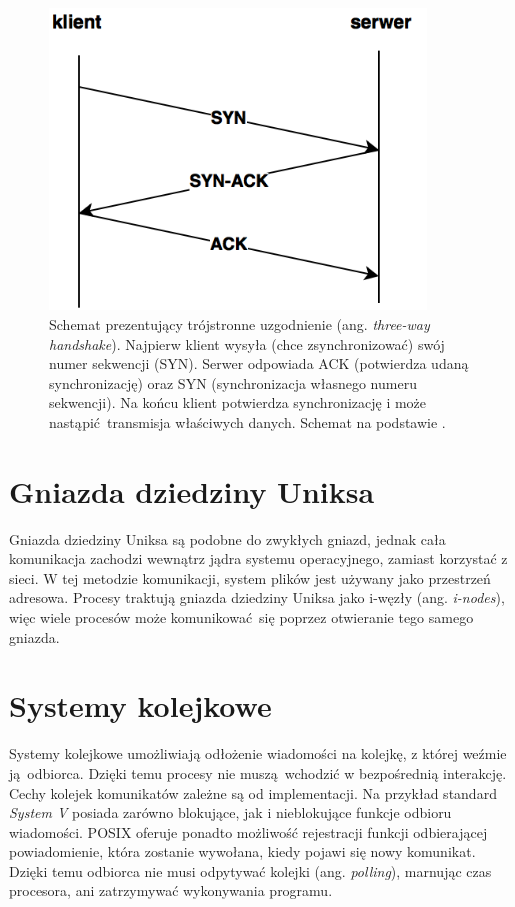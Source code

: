 \begin{figure}[h]
    \centering
    \includegraphics[height=8cm,keepaspectratio]{img/TCP_handshake.png}
    \caption{Schemat prezentujący trójstronne uzgodnienie (ang. \textit{three-way handshake}). Najpierw klient wysyła (chce zsynchronizować) swój numer sekwencji (SYN). Serwer odpowiada ACK (potwierdza udaną synchronizację) oraz SYN (synchronizacja własnego numeru sekwencji). Na końcu klient potwierdza synchronizację i może nastąpić transmisja właściwych danych. Schemat na podstawie \cite{TCPIP_guide}.}
    \label{fig:TCP_handshake}
\end{figure}


\section{Gniazda dziedziny Uniksa}

Gniazda dziedziny Uniksa są podobne do zwykłych gniazd, jednak cała komunikacja zachodzi wewnątrz jądra systemu operacyjnego, zamiast korzystać z sieci. W tej metodzie komunikacji, system plików jest używany jako przestrzeń adresowa. Procesy traktują gniazda dziedziny Uniksa jako i-węzły (ang. \textit{i-nodes}), więc wiele procesów może komunikować się poprzez otwieranie tego samego gniazda.


\section{Systemy kolejkowe}

Systemy kolejkowe umożliwiają odłożenie wiadomości na kolejkę, z której weźmie ją odbiorca. Dzięki temu procesy nie muszą wchodzić w bezpośrednią interakcję. Cechy kolejek komunikatów zależne są od implementacji. Na przykład standard \textit{System V} posiada zarówno blokujące, jak i nieblokujące funkcje odbioru wiadomości. POSIX oferuje ponadto możliwość rejestracji funkcji odbierającej powiadomienie, która zostanie wywołana, kiedy pojawi się nowy komunikat. Dzięki temu odbiorca nie musi odpytywać kolejki (ang. \textit{polling}), marnując czas procesora, ani zatrzymywać wykonywania programu.


